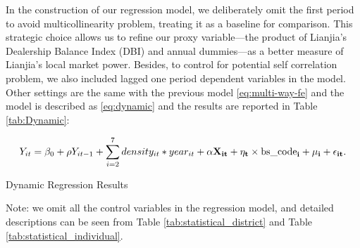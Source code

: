 \documentclass[11pt]{article}
\begin{document}
In the construction of our regression model, we deliberately omit the first period to avoid multicollinearity problem, treating it as a baseline for comparison. This strategic choice allows us to refine our proxy variable—the product of Lianjia's Dealership Balance Index (DBI) and annual dummies—as a better measure of Lianjia's local market power. Besides, to control for potential self correlation problem, we also included lagged one period dependent variables in the model. Other settings are the same with the previous model \eqref{eq:multi-way-fe} and the model is described as \eqref{eq:dynamic} and the results are reported in Table \ref{tab:Dynamic}: 

\begin{equation}
  Y_{it} = \beta_0 + \rho Y_{it-1} + \sum_{i=2}^7 density_{it} * year_{it} + \bf{\alpha} \bf{X}_{it} + \eta_{t} \times \text{bs\_code}_i + \mu_i + \epsilon_{it}. \label{eq:dynamic}
\end{equation}

\begin{table}[H]
  \begin{center}
    \begin{scriptsize}
    \caption{Dynamic Regression Results}
    \label{tab:Dynamic}
    

    Note: we omit all the control variables in the regression model, and detailed descriptions can be seen from Table \ref{tab:statistical_district} and Table \ref{tab:statistical_individual}.
    \end{scriptsize}
  \end{center}
\end{table}
\end{document}
